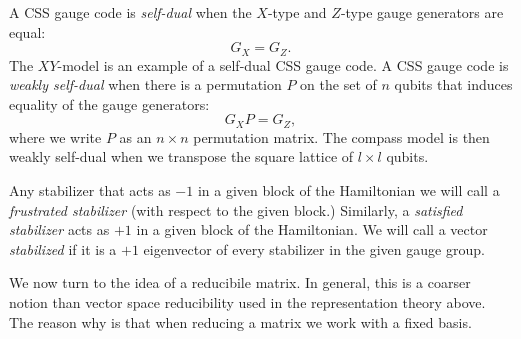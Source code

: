 

A CSS gauge code is \emph{self-dual} when the $X$-type and $Z$-type
gauge generators are equal: $$G_X = G_Z.$$
The $XY$-model is an example of a self-dual CSS gauge code.
A CSS gauge code is \emph{weakly self-dual}
when there is a permutation $P$ on the set of $n$ qubits
that induces equality of the gauge generators:
$$
    G_X P = G_Z,
$$
where we write $P$ as an $n\times n$ permutation matrix.
The compass model is then weakly self-dual when we transpose
the square lattice of $l\times l$ qubits.

Any stabilizer that acts as $-1$ in a given block of
the Hamiltonian we will call a \emph{frustrated stabilizer}
(with respect to the given block.)
Similarly, a \emph{satisfied stabilizer} acts as $+1$ in a given
block of the Hamiltonian.
We will call a
vector \emph{stabilized} if it is a $+1$ eigenvector 
of every stabilizer in the given gauge group.

We now turn to the idea of a reducibile matrix.
In general, this is a coarser notion than
vector space reducibility used in the representation theory above.
The reason why is that when reducing a matrix we work
with a fixed basis.

